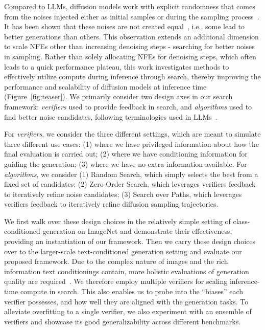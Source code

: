 Compared to LLMs, diffusion models work with explicit randomness that comes from the noises injected either as initial samples or during the sampling process~\citep{song2021scorebased, xu2023restart}. It has been shown that these noises are not created equal~\citep{ahn2024noiseworthdiffusionguidance, qi2024not}, i.e., some lead to better generations than others. This observation extends an additional dimension to scale NFEs other than increasing denoising steps - searching for better noises in sampling. Rather than solely allocating NFEs for denoising steps, which often leads to a quick performance plateau, this work investigates methods to effectively utilize compute during inference through search, thereby improving the performance and scalability of diffusion models at inference time (Figure~\ref{fig:teaser}). We primarily consider two design axes in our search framework: \emph{verifiers} used to provide feedback in search, and \emph{algorithms} used to find better noise candidates, following terminologies used in LLMs~\citep{snell2024scaling}.


For \textit{verifiers}, we consider the three different settings, which are meant to simulate three different use cases: (1) where we have privileged information about how the final evaluation is carried out; (2) where we have conditioning information for guiding the generation; (3) where we have no extra information available. For \textit{algorithms}, we consider (1) Random Search, which simply selects the best from a fixed set of candidates; (2) Zero-Order Search, which leverages verifiers feedback to iteratively refine noise candidates; (3) Search over Paths, which leverages verifiers feedback to iteratively refine diffusion sampling trajectories.

We first walk over these design choices in the relatively simple setting of class-conditioned generation on ImageNet and demonstrate their effectiveness, providing an instantiation of our framework. Then we carry these design choices over to the larger-scale text-conditioned generation setting and evaluate our proposed framework. Due to the complex nature of images and the rich information text conditionings contain, more holistic evaluations of generation quality are required~\citep{lee2024holistic}. We therefore employ multiple verifiers for scaling inference-time compute in search. This also enables us to probe into the ``biases'' each verifier possesses, and how well they are aligned with the generation tasks. To alleviate overfitting to a single verifier, we also experiment with an ensemble of verifiers and showcase its good generalizability across different benchmarks.

